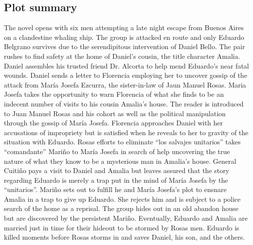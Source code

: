 \documentclass[12pt]{report}
\begin{document}
\subsection{Plot summary}

The novel opens with six men attempting a late night escape from Buenos Aires on a clandestine whaling ship. The group is attacked en route and only Eduardo Belgrano survives due to the serendipitous intervention of Daniel Bello. The pair rushes to find safety at the home of Daniel’s cousin, the title character Amalia. Daniel assembles his trusted friend Dr. Alcorta to help mend Eduardo's near fatal wounds. Daniel sends a letter to Florencia employing her to uncover gossip of the attack from María Josefa Ezcurra, the sister-in-law of Jaun Manuel Rosas. Maria Josefa takes the opportunity to warn Florencia of what she finds to be an indecent number of visits to his cousin Amalia's house. The reader is introduced to Juan Manuel Rosas and his cohort as well as the political manipulation through the gossip of María Josefa. Florencia approaches Daniel with her accusations of impropriety but is satisfied when he reveals to her to gravity of the situation with Eduardo. Rosas efforts to eliminate \enquote{los salvajes unitarios} takes \enquote{comandante} Mariño to María Josefa in search of help uncovering the true nature of what they know to be a mysterious man in Amalia's house. General Cuitiño pays a visit to Daniel and Amalia but leaves assured that the story regarding Eduardo is merely a trap put in the mind of María Josefa by the \enquote{unitarios}. Mariño sets out to fulfill he and María Josefa's plot to ensnare Amalia in a trap to give up Eduardo. She rejects him and is subject to a police search of the home as a reprisal. The group hides out in an old abandon house but are discovered by the persistent Mariño. Eventually, Eduardo and Amalia are married just in time for their hideout to be stormed by Rosas men. Eduardo is killed moments before Rosas storms in and saves Daniel, his son, and the others.
 
\end{document}
